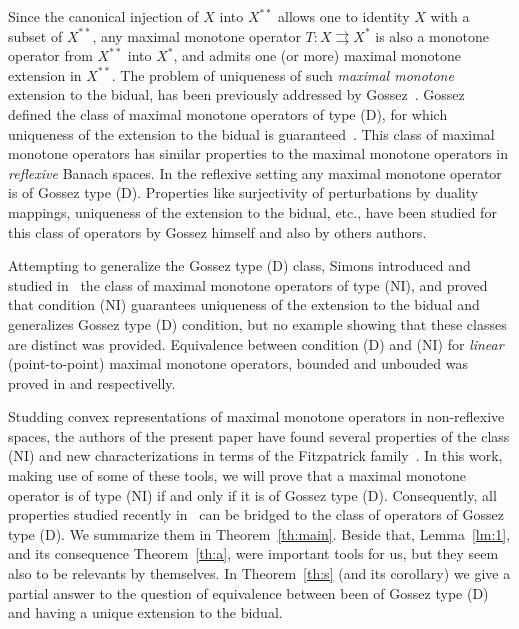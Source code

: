 \documentclass[11pt]{article}
\newcommand{\tos}{\rightrightarrows} %
\begin{document}
Since the canonical injection of $X$ into $X^{**}$ allows one to
identity $X$ with a subset of $X^{**}$, any maximal monotone operator
$T:X\tos X^*$ is also a monotone operator from $X^{**}$ into $X^*$,
and admits one (or more) maximal monotone extension in $X^{**}$.
%
The problem of uniqueness of
such \emph{maximal monotone} extension to the bidual, has been
previously addressed by Gossez~\cite{gos-ope.jmaa71,gos-ran.pams72,
  gos-con.pams76,gos-ext.pams76}. Gossez defined the class of maximal
monotone operators of type (D), for which uniqueness of the extension
to the bidual is guaranteed~\cite{gos-ext.pams76}. This class of
maximal monotone operators has similar properties to the maximal
monotone operators in {\it reflexive} Banach spaces. In the reflexive
setting any maximal monotone operator is of Gossez type (D).
Properties like surjectivity of perturbations by duality mappings,
uniqueness of the extension to the bidual, etc., have been studied for
this class of operators by Gossez himself and also by others authors.
%

Attempting to generalize the Gossez type (D) class, Simons introduced
and studied in~\cite{sim-ran.jmaa96} the class of maximal monotone
operators of type (NI),
%
and proved that condition (NI) guarantees uniqueness of the extension
to the bidual and generalizes Gossez type (D) condition, but no
example showing that these classes are distinct was provided.
%
Equivalence between condition (D) and (NI) for \emph{linear}
(point-to-point) maximal monotone operators, bounded and unbouded was
proved in \cite{bau-bor-1999} and \cite{phe.sim-unb.jca98}
respectivelly.



Studding convex representations of maximal monotone operators in
non-reflexive spaces, the authors of the present paper
have found several properties of the class (NI) and new
characterizations in terms of the Fitzpatrick
family~\cite{Alves2008n,alv.sva-bro.jca08,alv.sva-max.jca09,alv.sva-new.jca09}.
%
In this work, making use of some of these tools, we will prove that a
maximal monotone operator is of type (NI) if and only if it is of
Gossez type (D).
%
Consequently, all properties studied recently in~\cite{Alves2008n,
  alv.sva-bro.jca08,alv.sva-max.jca09, alv.sva-new.jca09} can be
bridged to the class of operators of Gossez type (D).
%
We summarize them in Theorem~\ref{th:main}.
Beside that, 
 Lemma~\ref{lm:1}, 
and its consequence Theorem~\ref{th:a}, were important tools for us, but they
seem also to be relevants by themselves.
In Theorem~\ref{th:s} (and its corollary) we give a partial answer to
the question of equivalence between been of Gossez type (D) and having
a unique extension to the bidual.
\end{document}
